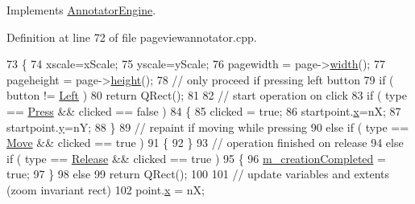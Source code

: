 Implements \hyperlink{classAnnotatorEngine_acca989fc60f9a6c20ed2518fafa8774e}{Annotator\+Engine}.



Definition at line 72 of file pageviewannotator.\+cpp.


\begin{DoxyCode}
73         \{
74             xscale=xScale;
75             yscale=yScale;
76             pagewidth = page->\hyperlink{classOkular_1_1Page_a57114e88281da2a51b1bb0d5d4996d53}{width}();
77             pageheight = page->\hyperlink{classOkular_1_1Page_a67246a32b3e625946eb5c685b8372a4f}{height}();
78             \textcolor{comment}{// only proceed if pressing left button}
79             \textcolor{keywordflow}{if} ( button != \hyperlink{classAnnotatorEngine_ac2e3b75e12bacbb6974d15dd53954567a2719e853d63982d67e9d8aae3620178c}{Left} )
80                 \textcolor{keywordflow}{return} QRect();
81 
82             \textcolor{comment}{// start operation on click}
83             \textcolor{keywordflow}{if} ( type == \hyperlink{classAnnotatorEngine_a00fb22eb4cb6eafb056f9066031db133a7f6f77a85d31dc6afd375db9a53d5069}{Press} && clicked == \textcolor{keyword}{false} )
84             \{
85                 clicked = \textcolor{keyword}{true};
86                 startpoint.\hyperlink{classOkular_1_1NormalizedPoint_a857f49b9bc7712430d167472ef9dbd94}{x}=nX;
87                 startpoint.\hyperlink{classOkular_1_1NormalizedPoint_ac2276daabda627d5f82bb1532c293047}{y}=nY;
88             \}
89             \textcolor{comment}{// repaint if moving while pressing}
90             \textcolor{keywordflow}{else} \textcolor{keywordflow}{if} ( type == \hyperlink{classAnnotatorEngine_a00fb22eb4cb6eafb056f9066031db133a4efcf099c4a82b1eab7de0fb124563a8}{Move} && clicked == \textcolor{keyword}{true} )
91             \{
92             \}
93             \textcolor{comment}{// operation finished on release}
94             \textcolor{keywordflow}{else} \textcolor{keywordflow}{if} ( type == \hyperlink{classAnnotatorEngine_a00fb22eb4cb6eafb056f9066031db133ac80dbad38d0461d9e546aa694c2abc1c}{Release} && clicked == \textcolor{keyword}{true} )
95             \{
96                 \hyperlink{classAnnotatorEngine_a0df119b4d87a1e3ea8ed60a96d7ff444}{m\_creationCompleted} = \textcolor{keyword}{true};
97             \}
98             \textcolor{keywordflow}{else}
99                 \textcolor{keywordflow}{return} QRect();
100 
101             \textcolor{comment}{// update variables and extents (zoom invariant rect)}
102             point.\hyperlink{classOkular_1_1NormalizedPoint_a857f49b9bc7712430d167472ef9dbd94}{x} = nX;

\end{DoxyCode}
